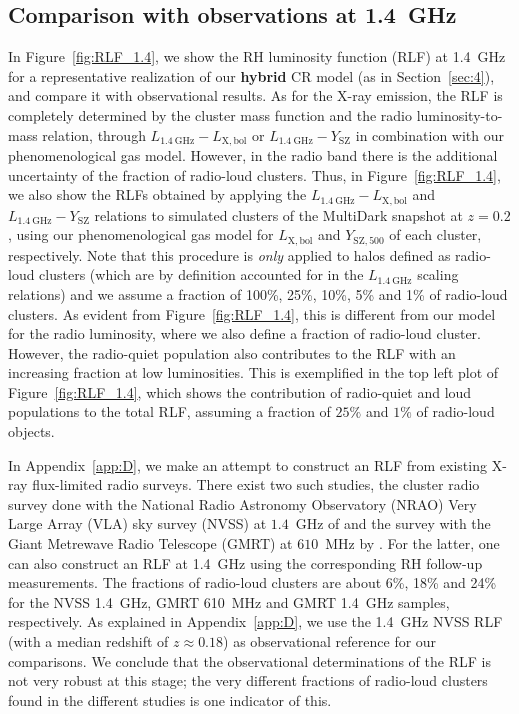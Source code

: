 \documentclass[traditabstract]{aa}
\def\C#1{{\bf #1}}
\newcommand{\rmn}{\mathrm}
\begin{document}
\subsection{Comparison with observations at 1.4~GHz}

In Figure~\ref{fig:RLF_1.4}, we show the RH luminosity function (RLF) at 1.4~GHz
for a representative realization of our \C{hybrid} CR model (as in
Section~\ref{sec:4}), and compare it with observational results. As for the X-ray
emission, the RLF is completely determined by the cluster mass function and the
radio luminosity-to-mass relation, through $L_{1.4~\rmn{GHz}}-L_{ \rmn{X,bol}}$
or $L_{1.4~\rmn{GHz}}-Y_{\rmn{SZ}}$ in combination with our phenomenological gas
model. However, in the radio band there is the additional uncertainty of the
fraction of radio-loud clusters. Thus, in Figure~\ref{fig:RLF_1.4}, we also show
the RLFs obtained by applying the $L_{1.4~\rmn{GHz}}-L_{\rmn{X,bol}}$
and $L_{1.4~\rmn{GHz}}-Y_{\rmn{SZ}}$ relations to simulated clusters of the
MultiDark snapshot at $z = 0.2$, using our phenomenological gas model for
$L_{\rmn{X,bol}}$ and $Y_{\rmn{SZ}, 500}$ of each cluster, respectively. Note
that this procedure is {\em only} applied to halos defined as radio-loud
clusters (which are by definition accounted for in the $L_{1.4~\rmn{GHz}}$
scaling relations) and we assume a fraction of 100\%, 25\%, 10\%, 5\% and 1\% of
radio-loud clusters. As evident from Figure~\ref{fig:RLF_1.4}, this is different
from our model for the radio luminosity, where we also define a fraction of
radio-loud cluster. However, the radio-quiet population also contributes to the
RLF with an increasing fraction at low luminosities. This is exemplified in the
top left plot of Figure~\ref{fig:RLF_1.4}, which shows the contribution of
radio-quiet and loud populations to the total RLF, assuming a fraction of $25\%$
and $1\%$ of radio-loud objects.

In Appendix~\ref{app:D}, we make an attempt to construct an RLF from existing
X-ray flux-limited radio surveys. There exist two such studies, the cluster
radio survey done with the National Radio Astronomy Observatory (NRAO) Very
Large Array (VLA) sky survey (NVSS) at $1.4$~GHz of \cite{1999NewA....4..141G}
and the survey with the Giant Metrewave Radio Telescope (GMRT) at $610$~MHz by
\cite{VenturiGMRT_1,VenturiGMRT_2}. For the latter, one can also construct an RLF
at 1.4~GHz using the corresponding RH follow-up measurements. The fractions of
radio-loud clusters are about 6\%, 18\% and 24\% for the NVSS 1.4~GHz, GMRT
610~MHz and GMRT 1.4~GHz samples, respectively. As explained in
Appendix~\ref{app:D}, we use the 1.4~GHz NVSS RLF (with a median redshift of $z
\approx 0.18$) as observational reference for our comparisons. We conclude that
the observational determinations of the RLF is not very robust at this stage;
the very different fractions of radio-loud clusters found in the different
studies is one indicator of this.
  
\end{document}
